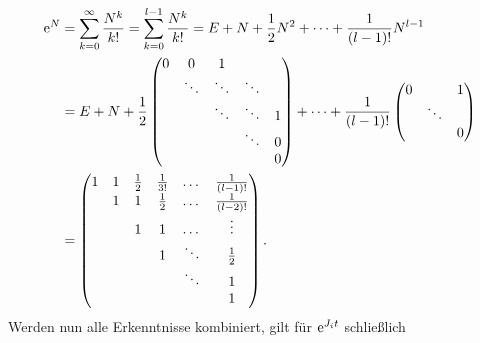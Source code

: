 \begin{align*}
    \mathrm{e}^N &= \sum^\infty_{k=0} \frac{N^k}{k!}
        = \sum^{l-1}_{k=0} \frac{N^k}{k!}
        = E + N + \frac{1}{2} N^2 + \dots + \frac{1}{(l-1)!} N^{l-1}\\
    &= E + N +  \frac{1}{2} \begin{pmatrix}
                                0 & 0      & 1      &        & \\
                                  & \ddots & \ddots & \ddots & \\
                                  &        & \ddots & \ddots & 1\\
                                  &        &        & \ddots & 0\\
                                  &        &        &        & 0
                            \end{pmatrix}
        + \dots + \frac{1}{(l-1)!}  \begin{pmatrix}
                                        0 &        & 1\\
                                          & \ddots & \\
                                          &        & 0
                                    \end{pmatrix}\\
    &= \begin{pmatrix}
           1 & 1 & \frac{1}{2} & \frac{1}{3!} & \dots  & \frac{1}{(l-1)!}\\
           & 1 & 1             & \frac{1}{2}  & \dots  & \frac{1}{(l-2)!}\\
           &   & 1             & 1              & \dots  & \vdots\\
           &   &               & 1              & \ddots & \frac{1}{2}\\
           &   &               &                & \ddots & 1\\
           &   &               &                &        & 1
    \end{pmatrix}.
\end{align*}
Werden nun alle Erkenntnisse kombiniert, gilt für $\mathrm{e}^{J_i t}$ schließlich
